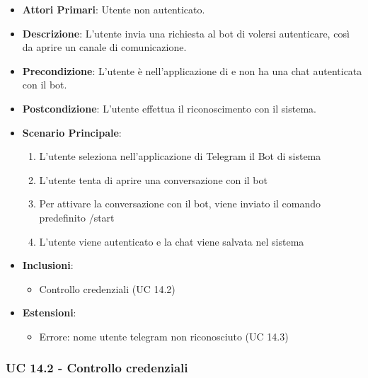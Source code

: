 	\begin{itemize}
		\item \textbf{Attori Primari}: Utente non autenticato.
		\item \textbf{Descrizione}: L'utente invia una richiesta al bot di volersi autenticare, così da aprire un canale di comunicazione.
		\item \textbf{Precondizione}: L'utente è nell'applicazione di  e non ha una chat autenticata con il bot.
		\item \textbf{Postcondizione}: L'utente effettua il riconoscimento con il sistema.
		\item \textbf{Scenario Principale}:
		\begin{enumerate}
			\item L'utente seleziona nell'applicazione di Telegram il Bot di sistema
			\item L'utente tenta di aprire una conversazione con il bot
			\item Per attivare la conversazione con il bot, viene inviato il comando predefinito /start
			\item L'utente viene autenticato e la chat viene salvata nel sistema
		\end{enumerate}
		\item \textbf{Inclusioni}:
		\begin{itemize}
			\item Controllo credenziali (UC 14.2)
		\end{itemize}
		\item \textbf{Estensioni}:
		\begin{itemize}
			\item Errore: nome utente telegram non riconosciuto (UC 14.3)
		\end{itemize}
	\end{itemize}

	\subsubsection{UC 14.2 - Controllo credenziali}

